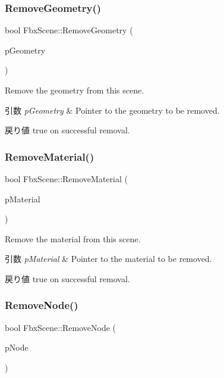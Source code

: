 \subsubsection{\texorpdfstring{Remove\+Geometry()}{RemoveGeometry()}}
{\footnotesize\ttfamily bool Fbx\+Scene\+::\+Remove\+Geometry (\begin{DoxyParamCaption}\item[{\hyperlink{class_fbx_geometry}{Fbx\+Geometry} $\ast$}]{p\+Geometry }\end{DoxyParamCaption})}

Remove the geometry from this scene. 
\begin{DoxyParams}{引数}
{\em p\+Geometry} & Pointer to the geometry to be removed. \\
\hline
\end{DoxyParams}
\begin{DoxyReturn}{戻り値}
true on successful removal. 
\end{DoxyReturn}
\mbox{\label{class_fbx_scene_a901ad0c4394b3ee5bf675ee91e54adc0}} 
\subsubsection{\texorpdfstring{Remove\+Material()}{RemoveMaterial()}}
{\footnotesize\ttfamily bool Fbx\+Scene\+::\+Remove\+Material (\begin{DoxyParamCaption}\item[{\hyperlink{class_fbx_surface_material}{Fbx\+Surface\+Material} $\ast$}]{p\+Material }\end{DoxyParamCaption})}

Remove the material from this scene. 
\begin{DoxyParams}{引数}
{\em p\+Material} & Pointer to the material to be removed. \\
\hline
\end{DoxyParams}
\begin{DoxyReturn}{戻り値}
true on successful removal. 
\end{DoxyReturn}
\mbox{\label{class_fbx_scene_a2e66ac740f8ff46ef58d0fb3dbbe5c65}} 
\subsubsection{\texorpdfstring{Remove\+Node()}{RemoveNode()}}
{\footnotesize\ttfamily bool Fbx\+Scene\+::\+Remove\+Node (\begin{DoxyParamCaption}\item[{\hyperlink{class_fbx_node}{Fbx\+Node} $\ast$}]{p\+Node }\end{DoxyParamCaption})}

